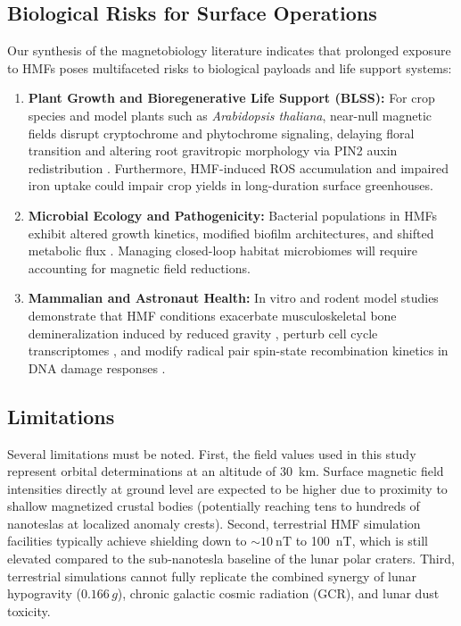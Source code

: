 \subsection{Biological Risks for Surface Operations}
Our synthesis of the magnetobiology literature indicates that prolonged exposure to HMFs poses multifaceted risks to biological payloads and life support systems:
\begin{enumerate}
    \item \textbf{Plant Growth and Bioregenerative Life Support (BLSS):} For crop species and model plants such as \textit{Arabidopsis thaliana}, near-null magnetic fields disrupt cryptochrome and phytochrome signaling, delaying floral transition and altering root gravitropic morphology via PIN2 auxin redistribution \citep{Agliassa2018, Narayana2018}. Furthermore, HMF-induced ROS accumulation and impaired iron uptake \citep{Maffei2014, Narayana2021} could impair crop yields in long-duration surface greenhouses.
    \item \textbf{Microbial Ecology and Pathogenicity:} Bacterial populations in HMFs exhibit altered growth kinetics, modified biofilm architectures, and shifted metabolic flux \citep{Creanga2009, Zhang2017}. Managing closed-loop habitat microbiomes will require accounting for magnetic field reductions.
    \item \textbf{Mammalian and Astronaut Health:} In vitro and rodent model studies demonstrate that HMF conditions exacerbate musculoskeletal bone demineralization induced by reduced gravity \citep{Xu2012, Mo2014}, perturb cell cycle transcriptomes \citep{Mo2012}, and modify radical pair spin-state recombination kinetics in DNA damage responses \citep{Binhi2017, Hore2016}.
\end{enumerate}

\subsection{Limitations}
Several limitations must be noted. First, the field values used in this study represent orbital determinations at an altitude of \SI{30}{\kilo\meter}. Surface magnetic field intensities directly at ground level are expected to be higher due to proximity to shallow magnetized crustal bodies (potentially reaching tens to hundreds of nanoteslas at localized anomaly crests). Second, terrestrial HMF simulation facilities typically achieve shielding down to $\sim\SI{10}{\nano\tesla}$ to \SI{100}{\nano\tesla}, which is still elevated compared to the sub-nanotesla baseline of the lunar polar craters. Third, terrestrial simulations cannot fully replicate the combined synergy of lunar hypogravity ($0.166\,g$), chronic galactic cosmic radiation (GCR), and lunar dust toxicity.

